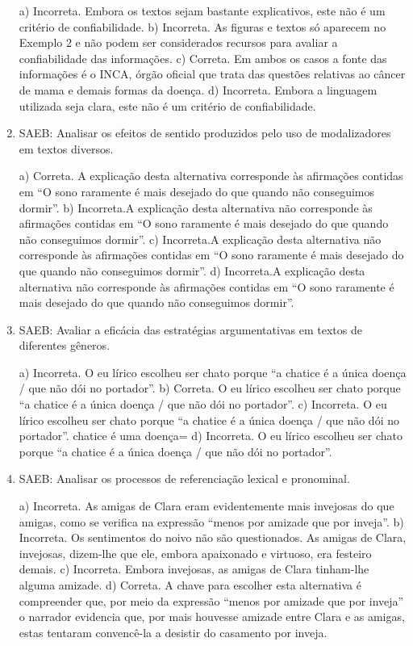 \begin{enumerate}
a) Incorreta. Embora os textos sejam bastante explicativos, este não é
um critério de confiabilidade.
b) Incorreta. As figuras e textos só aparecem no Exemplo 2 e não podem
ser considerados recursos para avaliar a confiabilidade das informações.
c) Correta. Em ambos os casos a fonte das informações é o INCA, órgão
oficial que trata das questões relativas ao câncer de mama e demais
formas da doença. 
d) Incorreta. Embora a linguagem utilizada seja clara, este não é um
critério de confiabilidade.
	
	\item
SAEB: Analisar os efeitos de sentido produzidos pelo uso de modalizadores em
textos diversos.

a) Correta. A explicação desta alternativa corresponde às afirmações contidas
em ``O sono raramente é mais desejado do que quando não conseguimos dormir''.
b) Incorreta.A explicação desta alternativa não corresponde às afirmações contidas
em ``O sono raramente é mais desejado do que quando não conseguimos dormir''.
c) Incorreta.A explicação desta alternativa não corresponde às afirmações contidas
em ``O sono raramente é mais desejado do que quando não conseguimos dormir''.
d) Incorreta.A explicação desta alternativa não corresponde às afirmações contidas
em ``O sono raramente é mais desejado do que quando não conseguimos dormir''.

	\item
SAEB: Avaliar a eficácia das estratégias argumentativas em textos de
diferentes gêneros.

a) Incorreta. O eu lírico escolheu ser chato porque ``a chatice é a única doença / 
que não dói no portador''. 
b) Correta. O eu lírico escolheu ser chato porque ``a chatice é a única doença / 
que não dói no portador''. 
c) Incorreta. O eu lírico escolheu ser chato porque ``a chatice é a única doença / 
que não dói no portador''. 
chatice é uma doença=
d) Incorreta. O eu lírico escolheu ser chato porque ``a chatice é a única doença / 
que não dói no portador''.

	\item
SAEB: Analisar os processos de referenciação lexical e pronominal.

a) Incorreta. As amigas de Clara eram evidentemente mais invejosas do que amigas, 
como se verifica na expressão ``menos por amizade que por inveja''.
b) Incorreta. Os sentimentos do noivo não são questionados. As amigas de Clara, 
invejosas, dizem-lhe que ele, embora apaixonado e virtuoso, era festeiro demais.
c) Incorreta. Embora invejosas, as amigas de Clara tinham-lhe alguma amizade.
d) Correta. A chave para escolher esta alternativa é compreender que, por meio da  
expressão ``menos por amizade que por inveja'' o narrador evidencia que, por mais 
houvesse amizade entre Clara e as amigas, estas tentaram convencê-la a desistir 
do casamento por inveja.
	

\end{enumerate}
